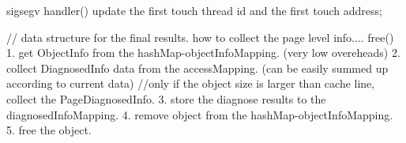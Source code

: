 
        sigsegv handler() {
            update the first touch thread id and the first touch address;
        }

        // data structure for the final results. how to collect the page level info....
        free() {
            1. get ObjectInfo from the hashMap-objectInfoMapping. (very low overeheads)
            2. collect DiagnosedInfo data from the accessMapping. (can be easily summed up according to current data)
            //only if the object size is larger than cache line, collect the PageDiagnosedInfo.
            3. store the diagnose results to the diagnosedInfoMapping.
            4. remove object from the hashMap-objectInfoMapping.
            5. free the object.
        }
